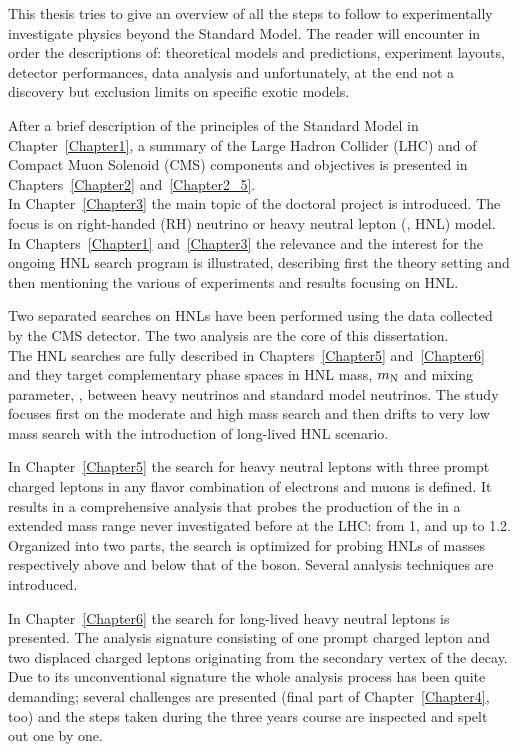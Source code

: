 This thesis tries to give an overview of all the steps to follow
to experimentally investigate physics
beyond the Standard Model. The reader will encounter in order the
descriptions of: theoretical models and predictions, experiment
layouts, detector performances, data analysis and unfortunately, at the
end not a discovery but exclusion limits on specific exotic models.

After a brief description of the principles of the Standard Model in
Chapter~\ref{Chapter1}, a summary of the Large Hadron Collider (LHC)
and of Compact Muon Solenoid (CMS) components and objectives is
presented in Chapters~\ref{Chapter2} and~\ref{Chapter2_5}.\\
In Chapter~\ref{Chapter3} the main topic of the doctoral project is
introduced. The focus is on right-handed (RH) neutrino or heavy
neutral lepton (\hnl, HNL)
model. In Chapters~\ref{Chapter1} and~\ref{Chapter3} 
the relevance and the interest for the
ongoing HNL search program is illustrated, describing first the theory setting 
and then mentioning the various of experiments and results
focusing on HNL.

Two separated searches on HNLs have been performed using the data
collected by the CMS detector. The two analysis are the core of this
dissertation.\\
The HNL searches are fully described in Chapters~\ref{Chapter5}
and~\ref{Chapter6} and they target complementary phase spaces in HNL mass, $m_\mathrm{N}$
and mixing parameter, \mixpar, between heavy neutrinos and standard
model neutrinos. The study focuses first on the
moderate and high mass search and then drifts to very low mass search with
the introduction of long-lived HNL scenario.

In Chapter~\ref{Chapter5} the search for heavy neutral leptons with three
prompt charged leptons in any flavor combination of electrons and
muons is defined. It results in a comprehensive analysis that probes the production of the
\hnl in a extended mass range never investigated before at the LHC:
from 1\GeV, and up to 1.2\TeV. 
Organized into two parts, the search is optimized for
probing HNLs of masses respectively above and below that of the \PW
boson. Several analysis techniques are introduced.

In Chapter~\ref{Chapter6} the search for long-lived heavy neutral
leptons is presented. The analysis signature
consisting of one prompt charged lepton and two displaced
charged leptons originating from the secondary vertex of the \hnl
decay. Due to its unconventional signature the whole analysis process has been
quite demanding; several challenges are presented (final part of
Chapter~\ref{Chapter4}, too) and the steps taken during the three
years course are inspected and spelt out one by one.

